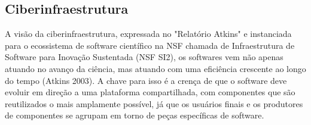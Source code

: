 
\subsection{Ciberinfraestrutura}

A visão da ciberinfraestrutura, expressada no "Relatório Atkins" e instanciada
para o ecossistema de software científico na NSF chamada de Infraestrutura de
Software para Inovação Sustentada (NSF SI2),
os softwares vem não apenas atuando no avanço da ciência, mas atuando com uma
eficiência crescente ao longo do tempo (Atkins 2003). A chave para isso é a
crença de que o software deve evoluir em direção a uma plataforma
compartilhada, com componentes que são reutilizados o mais amplamente possível,
já que os usuários finais e os produtores de componentes se agrupam em torno de
peças específicas de software.





